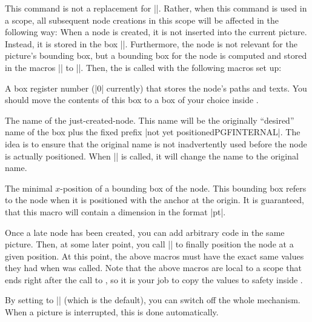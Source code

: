 \begin{command}{\pgfpositionnodelater{}}
  This command is not a replacement for |\pgfnode|. Rather, when this
  command is used in a scope, all subsequent node creations in this
  scope will be affected in the following way:  When a node is
  created, it is not inserted into the current picture. Instead, it
  is stored in the box |\pgfpositionnodelaterbox|. Furthermore, the
  node is not relevant for the picture's bounding box, but a bounding
  box for the node is computed and stored in the macros
  |\pgfpositionnodelaterminx| to |\pgfpositionnodelatermaxy|. Then,
  the  is called with the following macros set up:

  \begin{command}{\pgfpositionnodelaterbox}
    A box register number (|0| currently) that stores the node's paths
    and texts. You should move the contents of this box to a box of
    your choice inside .
  \end{command}

  \begin{command}{\pgfpositionnodelatername}
    The name of the just-created-node. This name will be the
    originally ``desired'' name of the box plus the fixed prefix
    |not yet positionedPGFINTERNAL|. The idea is to ensure that the
    original name is not inadvertently used before the node is actually
    positioned. When |\pgfpositionnodenow| is called, it will change
    the name to the original name.
  \end{command}

  \begin{command}{\pgfpositionnodelaterminx}
    The minimal $x$-position of a bounding box of the node. This
    bounding box refers to the node when it is positioned with the
    anchor at the origin. It is guaranteed, that this macro will
    contain a dimension in the format |pt|.
  \end{command}
  \begin{command}{\pgfpositionnodelaterminy}
  \end{command}
  \begin{command}{\pgfpositionnodelatermaxx}
  \end{command}
  \begin{command}{\pgfpositionnodelatermaxy}
  \end{command}

  Once a late node has been created, you can add arbitrary code in the
  same picture. Then, at some later point, you call
  |\pgfpositionnodenow| to finally position the node at a given
  position.  At this point, the above macros must have the exact same
  values they had when  was called. Note that the
  above macros are local to a scope that ends right after the call to
  , so it is your job to copy the values to safety
  inside .

  By setting  to |\relax| (which is the default), you
  can switch off the whole mechanism. When a picture is interrupted,
  this is done automatically.
\end{command}


